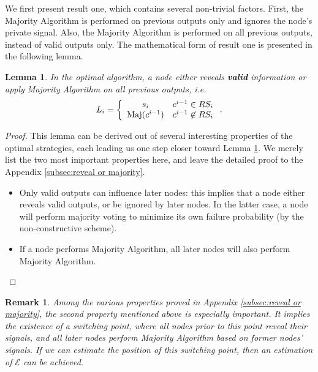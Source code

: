 \documentclass[a4paper,UKenglish]{lipics}
\newtheorem{lem}[thm]{Lemma}
\newtheorem{rmk}{Remark}
\theoremstyle{definition}
\newcommand{\Maj}{\text{Maj}}
\begin{document}
We first present result one,
	which contains several non-trivial factors.
First, the Majority Algorithm is performed on previous outputs only and ignores the node's private signal.
Also, the Majority Algorithm is performed on all previous outputs, instead of valid outputs only.
The mathematical form of result one is presented in the following lemma.
\begin{lem}
\label{lem:reveal or majority}
In the optimal algorithm, a node either reveals \textbf{valid} information or apply Majority Algorithm on all previous outputs, i.e.
\begin{equation*}
L_i 
= \left\{ 
	\begin{array}{c l}
		s_i & c^{i-1} \in RS_i \\
 		\Maj(c^{i-1}) & c^{i-1} \not \in RS_i
 	\end{array}
\right..
\end{equation*}
\end{lem}

\begin{proof}
This lemma can be derived out of several interesting properties of the optimal strategies,
	each leading us one step closer toward Lemma \ref{lem:reveal or majority}.
We merely list the two most important properties here, and leave the detailed proof to the Appendix \ref{subsec:reveal or majority}.
\begin{itemize}
\item Only valid outputs can influence later nodes: this implies that a node either reveals valid outputs,
		or be ignored by later nodes.
	In the latter case, a node will perform majority voting to minimize its own failure probability (by the non-constructive scheme).
\item If a node performs Majority Algorithm, all later nodes will also perform Majority Algorithm.
\end{itemize}
\end{proof}

\begin{rmk}
\label{rmk1}
Among the various properties proved in Appendix \ref{subsec:reveal or majority}, the second property mentioned above is especially important.
It implies the existence of a switching point, 
	where all nodes prior to this point reveal their signals, 
	and all later nodes perform Majority Algorithm based on former nodes' signals. 
If we can estimate the position of this switching point,
	then an estimation of $\mathcal{E}$ can be achieved.
\end{rmk}
\end{document}
